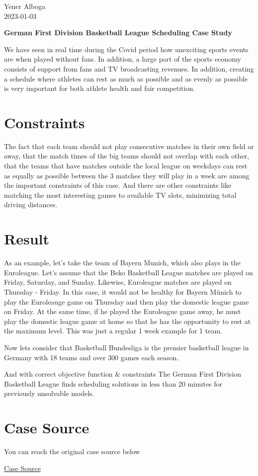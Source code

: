 \documentclass[
  letterpaper,
  DIV=11,
  numbers=noendperiod]{scrreprt}
\begin{document}
Yener Alboga\\
2023-01-03

\hfill\break

\textbf{German First Division Basketball League Scheduling Case Study}

We have seen in real time during the Covid period how unexciting sports
events are when played without fans. In addition, a large part of the
sports economy consists of support from fans and TV broadcasting
revenues. In addition, creating a schedule where athletes can rest as
much as possible and as evenly as possible is very important for both
athlete health and fair competition.

\hypertarget{constraints}{%
\section{Constraints}\label{constraints}}

The fact that each team should not play consecutive matches in their own
field or away, that the match times of the big teams should not overlap
with each other, that the teams that have matches outside the local
league on weekdays can rest as equally as possible between the 3 matches
they will play in a week are among the important constraints of this
case. And there are other constraints like matching the most interesting
games to available TV slots, minimizing total driving distances.

\hypertarget{result}{%
\section{Result}\label{result}}

As an example, let's take the team of Bayern Munich, which also plays in
the Euroleague. Let's assume that the Beko Basketball League matches are
played on Friday, Saturday, and Sunday. Likewise, Euroleague matches are
played on Thursday - Friday. In this case, it would not be healthy for
Bayern Münich to play the Euroleauge game on Thursday and then play the
domestic league game on Friday. At the same time, if he played the
Euroleague game away, he must play the domestic league game at home so
that he has the opportunity to rest at the maximum level. This was just
a regular 1 week example for 1 team.

Now lets consider that Basketball Bundesliga is the premier basketball
league in Germany with 18 teams and over 300 games each season.

And with correct objective function \& constraints The German First
Division Basketball League finds scheduling solutions in less than 20
minutes for previously unsolvable models.

\hypertarget{case-source}{%
\section{Case Source}\label{case-source}}

You can reach the original case source below

\href{https://www.gurobi.com/case_studies/german-first-division-basketball-league-scheduling/}{Case
Source}
\end{document}
